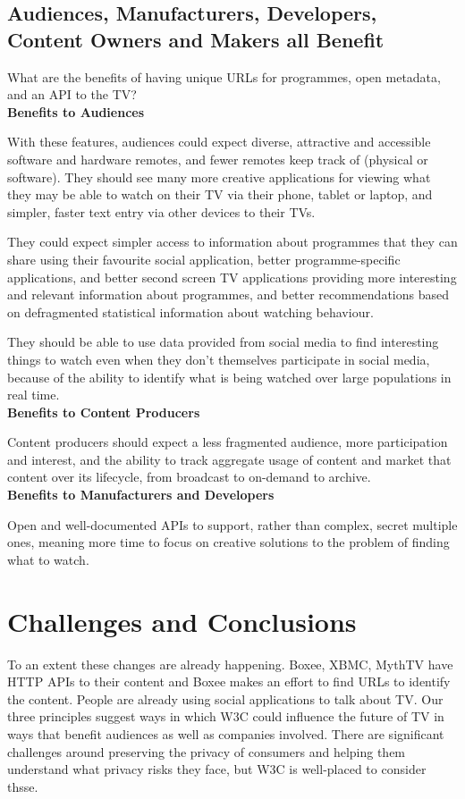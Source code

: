 \documentclass[]{article}%
\begin{document}
\subsection{Audiences, Manufacturers, Developers, Content Owners and Makers all Benefit}

What are the benefits of having unique URLs for programmes, open metadata, and an API to the TV?
\\

{\bf{Benefits to Audiences}}

With these features, audiences could expect diverse, attractive and accessible software and hardware remotes, and fewer remotes keep track of (physical or software). They should see many more creative applications for viewing what they may be able to watch on their TV via their phone, tablet or laptop, and simpler, faster text entry via other devices to their TVs. 

They could expect simpler access to information about programmes that they can share using their favourite social application, better programme-specific applications, and better second screen TV applications providing more interesting and relevant information about programmes, and better recommendations based on defragmented statistical information about watching behaviour.

They should be able to use data provided from social media to find interesting things to watch even when they don't themselves participate in social media, because of the ability to identify what is being watched over large populations in real time.
\\

{\bf{Benefits to Content Producers}}

Content producers should expect a less fragmented audience, more participation and interest, and the ability to track aggregate usage of content and market that content over its lifecycle, from broadcast to on-demand to archive.
\\

{\bf{Benefits to Manufacturers and Developers}}

Open and well-documented APIs to support, rather than complex, secret multiple ones, meaning more time to focus on creative solutions to the problem of finding what to watch.

\section{Challenges and Conclusions}

To an extent these changes are already happening. Boxee, XBMC, MythTV have HTTP APIs to their content and Boxee makes an effort to find URLs to identify the content. People are already using social applications to talk about TV. Our three principles suggest ways in which W3C could influence the future of TV in ways that benefit audiences as well as companies involved. There are significant challenges around preserving the privacy of consumers and helping them understand what privacy risks they face, but W3C is well-placed to consider thsse.
\end{document}
